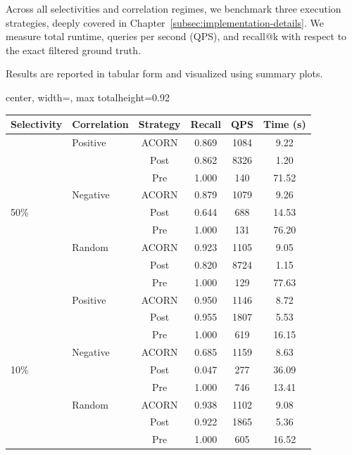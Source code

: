 Across all selectivities and correlation regimes, we benchmark three execution strategies, deeply covered in Chapter~\ref{subsec:implementation-details}.
We measure total runtime, queries per second (QPS), and recall@k with respect to the exact filtered ground truth. 

Results are reported in tabular form and visualized using summary plots.

\clearpage
\thispagestyle{plain}
\begin{center}
\vspace*{\fill}

\renewcommand{\arraystretch}{1.2}
\setlength{\tabcolsep}{10pt}
\normalsize

\begin{adjustbox}{center, width=\textwidth, max totalheight=0.92\textheight}
\begin{tabular}{llcccc}
\toprule
Selectivity & Correlation & Strategy & Recall & QPS & Time (s) \\
\midrule

\multirow{9}{*}{50\%}
& Positive & ACORN & 0.869 & 1084 & 9.22 \\
&          & Post  & 0.862 & 8326 & 1.20 \\
&          & Pre   & 1.000 & 140  & 71.52 \\
& Negative & ACORN & 0.879 & 1079 & 9.26 \\
&          & Post  & 0.644 & 688  & 14.53 \\
&          & Pre   & 1.000 & 131  & 76.20 \\
& Random   & ACORN & 0.923 & 1105 & 9.05 \\
&          & Post  & 0.820 & 8724 & 1.15 \\
&          & Pre   & 1.000 & 129  & 77.63 \\

\midrule

\multirow{9}{*}{10\%}
& Positive & ACORN & 0.950 & 1146 & 8.72 \\
&          & Post  & 0.955 & 1807 & 5.53 \\
&          & Pre   & 1.000 & 619  & 16.15 \\
& Negative & ACORN & 0.685 & 1159 & 8.63 \\
&          & Post  & 0.047 & 277  & 36.09 \\
&          & Pre   & 1.000 & 746  & 13.41 \\
& Random   & ACORN & 0.938 & 1102 & 9.08 \\
&          & Post  & 0.922 & 1865 & 5.36 \\
&          & Pre   & 1.000 & 605  & 16.52 \\


\end{tabular}
\end{adjustbox}
\end{center}
